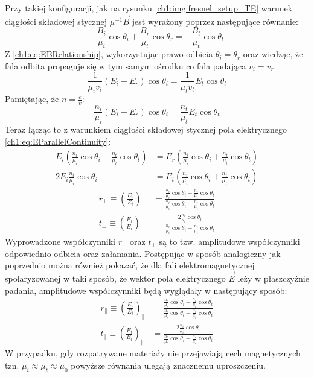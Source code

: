 Przy takiej konfiguracji, jak na rysunku \ref{ch1:img:fresnel_setup_TE} warunek ciągłości składowej stycznej $\mu^{-1}\vec{B}$ jest wyrażony poprzez następujące równanie:
\begin{equation}
-\frac{B_i}{\mu_i}\cos\theta_i + \frac{B_r}{\mu_i}\cos\theta_r = -\frac{B_t}{\mu_t}\cos\theta_t
\end{equation}
Z \eqref{ch1:eq:EBRelationship}, wykorzystując prawo odbicia $\theta_i = \theta_r$ oraz wiedząc, że fala odbita propaguje się w tym samym ośrodku co fala padająca $v_i = v_r$:
\begin{equation}
\frac{1}{\mu_iv_i}\left( E_i - E_r \right)\cos\theta_i = \frac{1}{\mu_tv_t}E_t\cos\theta_t
\end{equation}
Pamiętając, że $n = \frac{c}{v}$:
\begin{equation}
\frac{n_i}{\mu_i}\left(E_i - E_r \right)\cos\theta_i = \frac{n_t}{\mu_t}E_t\cos\theta_t
\end{equation}
Teraz łącząc to z warunkiem ciągłości składowej stycznej pola elektrycznego \eqref{ch1:eq:EParallelContinuity}:
\begin{align}
E_i\left( \frac{n_i}{\mu_i}\cos\theta_i - \frac{n_t}{\mu_t}\cos\theta_t \right) &= E_r\left( \frac{n_i}{\mu_i}\cos\theta_i + \frac{n_t}{\mu_t}\cos\theta_t \right)\\
2E_i\frac{n_i}{\mu_i}\cos\theta_i &= E_t\left( \frac{n_i}{\mu_i}\cos\theta_i + \frac{n_t}{\mu_t}\cos\theta_t \right)
\end{align}
\begin{align}
\label{ch1:eq:rPerpendicularGeneral}
r_\perp\equiv \left(\frac{E_r}{E_i}\right)_\perp &= \frac{\frac{n_i}{\mu_i}\cos\theta_i - \frac{n_t}{\mu_t}\cos\theta_t}{\frac{n_i}{\mu_i}\cos\theta_i + \frac{n_t}{\mu_t}\cos\theta_t}\\
t_\perp\equiv \left(\frac{E_t}{E_i}\right)_\perp &= \frac{2\frac{n_i}{\mu_i}\cos\theta_i}{\frac{n_i}{\mu_i}\cos\theta_i + \frac{n_t}{\mu_t}\cos\theta_t}
\end{align}
Wyprowadzone współczynniki $r_\perp$ oraz $t_\perp$ są to tzw. amplitudowe współczynniki odpowiednio odbicia oraz załamania.
Postępując w sposób analogiczny jak poprzednio można również pokazać, że dla fali elektromagnetycznej spolaryzowanej w taki sposób, że wektor pola elektrycznego $\vec{E}$ leży w płaszczyźnie padania, amplitudowe współczynniki będą wyglądały w następujący sposób:
\begin{align}
\label{ch1:eq:rParallelGeneral}
r_\parallel\equiv \left(\frac{E_r}{E_i}\right)_\parallel &= \frac{\frac{n_t}{\mu_t}\cos\theta_i - \frac{n_i}{\mu_i}\cos\theta_t}{\frac{n_t}{\mu_t}\cos\theta_i + \frac{n_i}{\mu_i}\cos\theta_t}\\
t_\parallel\equiv \left(\frac{E_t}{E_i}\right)_\parallel &= \frac{2\frac{n_i}{\mu_i}\cos\theta_i}{\frac{n_t}{\mu_t}\cos\theta_i + \frac{n_i}{\mu_i}\cos\theta_t}
\end{align}
W przypadku, gdy rozpatrywane materiały nie przejawiają cech magnetycznych tzn. $\mu_i \approx \mu_t \approx \mu_0$ powyższe równania ulegają znacznemu uproszczeniu.

